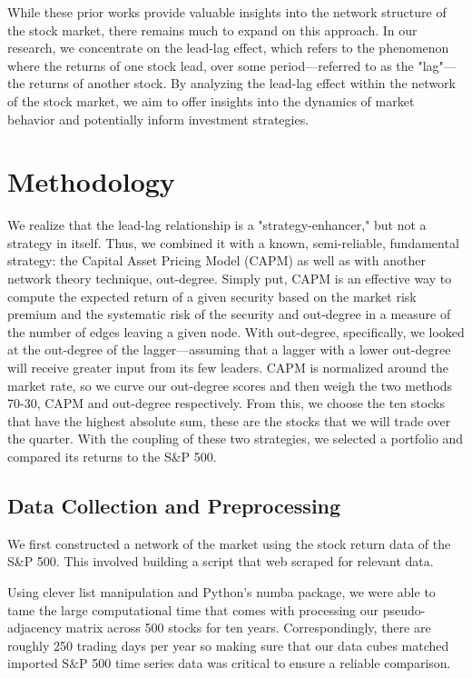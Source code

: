 \documentclass{article}
\begin{document}
While these prior works provide valuable insights into the network structure of the stock market, there remains much to expand on this approach. In our research, we concentrate on the lead-lag effect, which refers to the phenomenon where the returns of one stock lead, over some period—referred to as the "lag"—the returns of another stock. By analyzing the lead-lag effect within the network of the stock market, we aim to offer insights into the dynamics of  market behavior and potentially inform investment strategies.
\section{Methodology}
We realize that the lead-lag relationship is a "strategy-enhancer," but not a strategy in itself. Thus, we combined it with a known, semi-reliable, fundamental strategy: the  Capital Asset Pricing Model (CAPM) as well as with another network theory technique, out-degree. Simply put, CAPM is an effective way to compute the expected return of a given security based on the market risk premium and the systematic risk of the security and out-degree in a measure of the number of edges leaving a given node. With out-degree, specifically, we looked at the out-degree of the lagger—assuming that a lagger with a lower out-degree will receive greater input from its few leaders. CAPM is normalized around the market rate, so we curve our out-degree scores and then weigh the two methods 70-30, CAPM and out-degree respectively. From this, we choose the ten stocks that have the highest absolute sum, these are the stocks that we will trade over the quarter.
With the coupling of these two strategies, we selected a portfolio and compared its returns to the S\&P 500.
\subsection{Data Collection and Preprocessing}
We first constructed a network of the market using the stock return data of the S\&P 500. This involved building a script that web scraped for relevant data.

Using clever list manipulation and Python's  {\selectfont
numba} package, we were able to tame the large computational time that comes with processing our pseudo-adjacency matrix across 500 stocks for ten years. Correspondingly, there are roughly 250 trading days per year so making sure that our data cubes matched imported S$\&$P 500 time series data was critical to ensure a reliable comparison.
\end{document}
